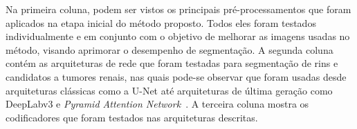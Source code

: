 \begin{table}[!ht]
\caption{Resumo dos diversos experimentos testados.}
\label{tab:diversos-experimentos}
\centering
\onehalfspacing
{}
\end{table}

Na primeira coluna, podem ser vistos os principais pré-processamentos que foram aplicados na etapa inicial do método proposto. Todos eles foram testados individualmente e em conjunto com o objetivo de melhorar as imagens usadas no método, visando aprimorar o desempenho de segmentação. A segunda coluna contém as arquiteturas de rede que foram testadas para segmentação de rins e candidatos a tumores renais, nas quais pode-se observar que foram usadas desde arquiteturas clássicas como a U-Net até arquiteturas de última geração como DeepLabv3 e \textit{Pyramid Attention Network}~\cite{li2018pyramid}. A terceira coluna mostra os codificadores que foram testados nas arquiteturas descritas.

